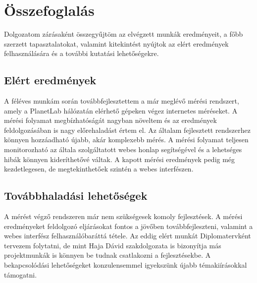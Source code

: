 \chapter{Összefoglalás}

Dolgozatom zárásaként összegyűjtöm az elvégzett munkák eredményeit, a főbb szerzett tapasztalatokat, valamint kitekintést nyújtok az elért eredmények felhasználására és a további kutatási lehetőségekre.

\section{Elért eredmények}

A féléves munkám során továbbfejlesztettem a már meglévő mérési rendszert, amely a PlanetLab hálózatán elérhető gépeken végez internetes méréseket. A mérési folyamat megbízhatóságát nagyban növeltem és az eredmények feldolgozásában is nagy előrehaladást értem el. Az általam fejlesztett rendszerhez könnyen hozzáadható újabb, akár komplexebb mérés. A mérési folyamat teljesen monitorozható az általa szolgáltatott webes honlap segítségével és a lehetséges hibák könnyen kideríthetővé váltak. A kapott mérési eredmények pedig még kezdetlegesen, de megtekinthetőek szintén a webes interfészen.
%


\section{Továbbhaladási lehetőségek}
A mérést végző rendszeren már nem szükségesek komoly fejlesztések. A mérési eredményeket feldolgozó eljárásokat fontos a jövőben továbbfejleszteni, valamint a webes interfész felhasználóbaráttá tétele. Az eddig elért munkát Diplomatervként tervezem folytatni, de mint Haja Dávid szakdolgozata is bizonyítja más projektmunkák is könnyen be tudnak csatlakozni a fejlesztésekbe. A bekapcsolódási lehetőségeket konzulensemmel igyekszünk újabb témakiírásokkal támogatni.


